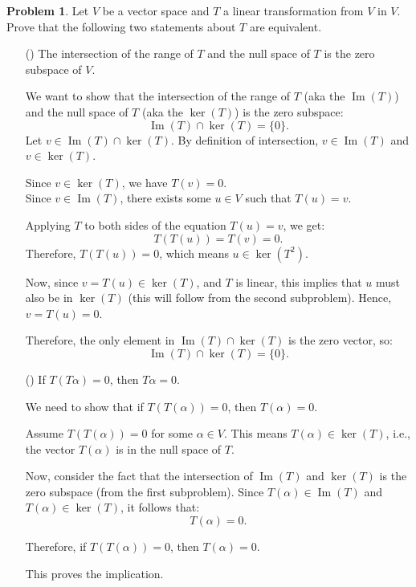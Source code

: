 \documentclass[12pt]{article}
\theoremstyle{definition}
\newtheorem{problem}{Problem}
\newcounter{subq}[problem]
\newenvironment{subproblem}
{\refstepcounter{subq} \begin{itemize} \item[(\alph{subq})]}
{\end{itemize} \medskip}
\begin{document}
\begin{problem}
    Let $V$ be a vector space and $T$ a linear transformation from $V$ in $V$. Prove that
    the following two statements about $T$ are equivalent.

    \begin{subproblem}
        The intersection of the range of $T$ and the null space of $T$ is the zero subspace of $V$.

        \begin{solution}
            We want to show that the intersection of the range of \( T \) (aka the \( \operatorname{Im}(T) \)) and the null space of \( T \) (aka the \( \ker(T) \)) is the zero subspace:
            \[
            \operatorname{Im}(T) \cap \ker(T) = \{ 0 \}.
            \]
            Let \( v \in \operatorname{Im}(T) \cap \ker(T) \). By definition of intersection, \( v \in \operatorname{Im}(T) \) and \( v \in \ker(T) \).

            Since \( v \in \ker(T) \), we have \( T(v) = 0 \).\\
            Since \( v \in \operatorname{Im}(T) \), there exists some \( u \in V \) such that \( T(u) = v \).

            Applying \( T \) to both sides of the equation \( T(u) = v \), we get:
            \[
            T(T(u)) = T(v) = 0.
            \]
            Therefore, \( T(T(u)) = 0 \), which means \( u \in \ker(T^2) \).

            Now, since \( v = T(u) \in \ker(T) \), and \( T \) is linear, this implies that \( u \) must also be in \( \ker(T) \) (this will follow from the second subproblem). Hence, \( v = T(u) = 0 \).

            Therefore, the only element in \( \operatorname{Im}(T) \cap \ker(T) \) is the zero vector, so:
            \[
            \operatorname{Im}(T) \cap \ker(T) = \{ 0 \}.
            \]
        \end{solution}
    \end{subproblem}

    \begin{subproblem}
        If $T(T\alpha) = 0$, then $T\alpha = 0$.

        \begin{solution}
            We need to show that if \( T(T(\alpha)) = 0 \), then \( T(\alpha) = 0 \).

            Assume \( T(T(\alpha)) = 0 \) for some \( \alpha \in V \). This means \( T(\alpha) \in \ker(T) \), i.e., the vector \( T(\alpha) \) is in the null space of \( T \). 

            Now, consider the fact that the intersection of \( \operatorname{Im}(T) \) and \( \ker(T) \) is the zero subspace (from the first subproblem). Since \( T(\alpha) \in \operatorname{Im}(T) \) and \( T(\alpha) \in \ker(T) \), it follows that:
            \[
            T(\alpha) = 0.
            \]

            Therefore, if \( T(T(\alpha)) = 0 \), then \( T(\alpha) = 0 \).

            This proves the implication.
        \end{solution}
    \end{subproblem}
\end{problem}
\end{document}
